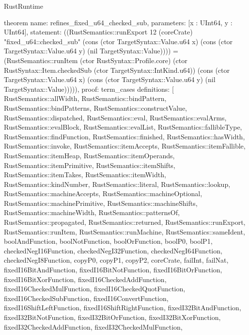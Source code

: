 \begin{lexlean}{RustRuntime}
\begin{semanticmodule}
theorem{
  name: refines_fixed_u64_checked_sub,
  parameters: [x : UInt64, y : UInt64],
  statement: ((RustSemantics::runExport 12 (coreCrate) "fixed_u64::checked_sub" (cons (ctor TargetSyntax::Value.u64 x) (cons (ctor TargetSyntax::Value.u64 y) (nil TargetSyntax::Value)))) = (RustSemantics::runItem (ctor RustSyntax::Profile.core) (ctor RustSyntax::Item.checkedSub (ctor TargetSyntax::IntKind.u64)) (cons (ctor TargetSyntax::Value.u64 x) (cons (ctor TargetSyntax::Value.u64 y) (nil TargetSyntax::Value))))),
  proof: term_cases{
    definitions: [
      RustSemantics::allWidth,
      RustSemantics::bindPattern,
      RustSemantics::bindPatterns,
      RustSemantics::constructValue,
      RustSemantics::dispatched,
      RustSemantics::eval,
      RustSemantics::evalArms,
      RustSemantics::evalBlock,
      RustSemantics::evalList,
      RustSemantics::fallibleType,
      RustSemantics::findFunction,
      RustSemantics::finished,
      RustSemantics::hasWidth,
      RustSemantics::invoke,
      RustSemantics::itemAccepts,
      RustSemantics::itemFallible,
      RustSemantics::itemHeap,
      RustSemantics::itemOperands,
      RustSemantics::itemPrimitive,
      RustSemantics::itemShifts,
      RustSemantics::itemTakes,
      RustSemantics::itemWidth,
      RustSemantics::kindNumber,
      RustSemantics::literal,
      RustSemantics::lookup,
      RustSemantics::machineAccepts,
      RustSemantics::machineOptional,
      RustSemantics::machinePrimitive,
      RustSemantics::machineShifts,
      RustSemantics::machineWidth,
      RustSemantics::patternsOf,
      RustSemantics::propagated,
      RustSemantics::returned,
      RustSemantics::runExport,
      RustSemantics::runItem,
      RustSemantics::runMachine,
      RustSemantics::sameIdent,
      boolAndFunction,
      boolNotFunction,
      boolOrFunction,
      boolP0,
      boolP1,
      checkedNegI16Function,
      checkedNegI32Function,
      checkedNegI64Function,
      checkedNegI8Function,
      copyP0,
      copyP1,
      copyP2,
      coreCrate,
      failInt,
      failNat,
      fixedI16BitAndFunction,
      fixedI16BitNotFunction,
      fixedI16BitOrFunction,
      fixedI16BitXorFunction,
      fixedI16CheckedAddFunction,
      fixedI16CheckedMulFunction,
      fixedI16CheckedQuotFunction,
      fixedI16CheckedSubFunction,
      fixedI16ConvertFunction,
      fixedI16ShiftLeftFunction,
      fixedI16ShiftRightFunction,
      fixedI32BitAndFunction,
      fixedI32BitNotFunction,
      fixedI32BitOrFunction,
      fixedI32BitXorFunction,
      fixedI32CheckedAddFunction,
      fixedI32CheckedMulFunction,
}}
\end{semanticmodule}
\end{lexlean}
